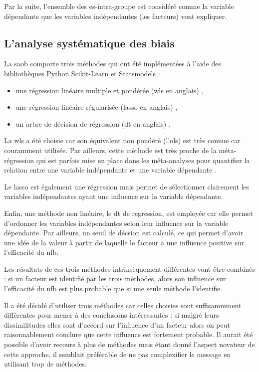 Par la suite, l'ensemble des \gls{es}-intra-groupe est considéré comme la variable dépendante que les variables indépendantes (les facteurs) vont expliquer. 

\subsection{L'analyse systématique des biais} \label{saob_method}

La \gls{saob} comporte trois méthodes qui ont été implémentées à l'aide des bibliothèques Python Scikit-Learn \citep[version 0.18.1]{Pedregosa2011} et Statsmodels \citep[version 0.8.0]{Seabold2010} : 
\begin{itemize}
    \item une régression linéaire multiple et pondérée (\gls{wls} en anglais) \citep{Montgomery2012},
	  \item une régression linéaire régularisée (\gls{lasso} en anglais) \citep{Tibshirani1996},
	  \item un arbre de décision de régression (\gls{dt} en anglais) \citep{Quinlan1986}.
\end{itemize}

La \gls{wls} a été choisie car son équivalent non pondéré (l'\gls{ols}) est très connue car couramment utilisée. Par ailleurs, cette méthode est très proche de la méta-régression qui est 
parfois mise en place dans les méta-analyses pour quantifier la relation entre une variable indépendante et une variable dépendante \citep{Cortese2016, Borenstein2009}. 

Le \gls{lasso} est également une régression mais permet de sélectionner clairement les variables indépendantes ayant une influence sur la variable dépendante. 

Enfin, une méthode non linéaire, le \gls{dt} de regression, est employée car elle permet d'ordonner les variables indépendantes selon leur influence sur la variable dépendante. 
Par ailleurs, un seuil de décsion est calculé, ce qui permet d'avoir une idée de la valeur à partir de laquelle le facteur a une influence positive sur l'efficacité du \gls{nfb}.

Les résultats de ces trois méthodes intrinsèquement différentes vont être combinés : si un facteur est identifié par les trois méthodes, alors son influence sur l'efficacité du 
\gls{nfb} est plus probable que si une seule méthode l'identifie. 

Il a été décidé d'utiliser trois méthodes car celles choisies sont suffisammment différentes pour mener à des conclusions intéressantes : si malgré leurs dissimilitudes 
elles sont d'accord sur l'influence d'un facteur alors on peut raisonnablement conclure que cette influence est fortement probable. Il aurait été possible
d'avoir recours à plus de méthodes mais étant donné l'aspect novateur de cette approche, il semblait préférable de ne pas complexifier le message en utilisant trop de méthodes.

